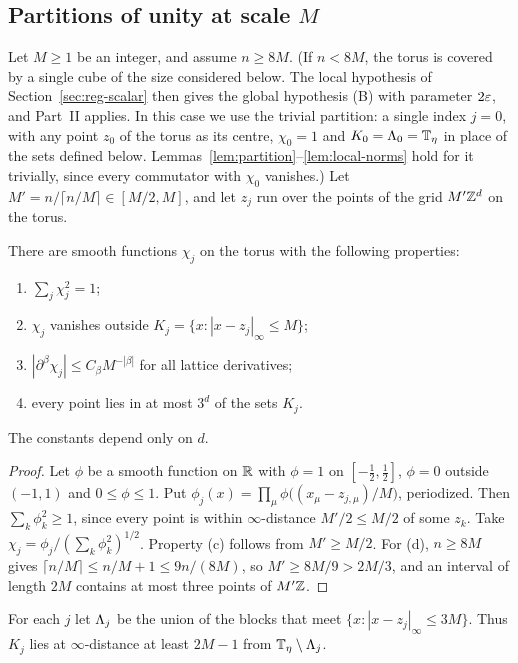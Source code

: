 \subsection{Partitions of unity at scale \texorpdfstring{$M$}{M}}

Let $M\ge1$ be an integer, and assume $n\ge8M$. (If $n<8M$, the torus is covered by a single cube of the size considered below. The local hypothesis of Section~\ref{sec:reg-scalar} then gives the global hypothesis (B) with parameter $2\varepsilon$, and Part~II applies. In this case we use the trivial partition: a single index $j=0$, with any point $z_0$ of the torus as its centre, $\chi_0=1$ and $K_0=\Lambda_0=\mathbb T_\eta$ in place of the sets defined below. Lemmas~\ref{lem:partition}--\ref{lem:local-norms} hold for it trivially, since every commutator with $\chi_0$ vanishes.) Let $M'=n/\lceil n/M\rceil\in[M/2,M]$, and let $z_j$ run over the points of the grid $M'\mathbb Z^d$ on the torus.

\begin{lemma}\label{lem:partition}
There are smooth functions $\chi_j$ on the torus with the following properties:
\begin{enumerate}[label=(\alph*)]
\item $\sum_j\chi_j^2=1$;
\item $\chi_j$ vanishes outside $K_j=\{x:|x-z_j|_\infty\le M\}$;
\item $|\partial^\beta\chi_j|\le C_\beta M^{-|\beta|}$ for all lattice derivatives;
\item every point lies in at most $3^d$ of the sets $K_j$.
\end{enumerate}
The constants depend only on $d$.
\end{lemma}

\begin{proof}
Let $\phi$ be a smooth function on $\mathbb R$ with $\phi=1$ on $[-\frac12,\frac12]$, $\phi=0$ outside $(-1,1)$ and $0\le\phi\le1$. Put $\phi_j(x)=\prod_\mu\phi\big((x_\mu-z_{j,\mu})/M\big)$, periodized. Then $\sum_k\phi_k^2\ge1$, since every point is within $\infty$-distance $M'/2\le M/2$ of some $z_k$. Take $\chi_j=\phi_j/(\sum_k\phi_k^2)^{1/2}$. Property (c) follows from $M'\ge M/2$. For (d), $n\ge8M$ gives $\lceil n/M\rceil\le n/M+1\le9n/(8M)$, so $M'\ge8M/9>2M/3$, and an interval of length $2M$ contains at most three points of $M'\mathbb Z$.
\end{proof}

For each $j$ let $\Lambda_j$ be the union of the blocks that meet $\{x:|x-z_j|_\infty\le3M\}$. Thus $K_j$ lies at $\infty$-distance at least $2M-1$ from $\mathbb T_\eta\setminus\Lambda_j$.

